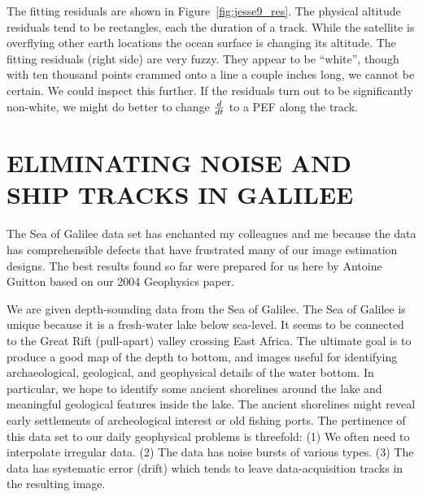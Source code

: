 \par
The fitting residuals
are shown in Figure~\ref{fig:jesse9_res}.
The physical altitude residuals tend to be rectangles,
each the duration of a track.
While the satellite is overflying other earth locations the ocean surface
is changing its altitude.
The fitting residuals (right side) are very fuzzy.
They appear to be ``white'', though with ten thousand points
crammed onto a line a couple inches long, we cannot be certain.
We could inspect this further.
If the residuals turn out to be significantly non-white,
we might do better to change $d\over dt$ to a PEF along the track.


















\section{ELIMINATING NOISE AND SHIP TRACKS IN GALILEE}

\par
The Sea of Galilee data set has enchanted my colleagues and me
because the data has comprehensible defects
that have frustrated many of our image estimation designs.
The best results found so far were prepared for us here
by Antoine Guitton based on our 2004 Geophysics paper.

\par

We are given depth-sounding data from the Sea of 
Galilee.  The Sea of Galilee is unique
because it is a fresh-water lake below sea-level.
It seems to be connected to the Great Rift (pull-apart)
valley crossing East Africa. The ultimate goal is to produce a good map of
the depth to bottom, and images useful for identifying archaeological,
geological, and geophysical details of the water bottom. In particular,
we hope to identify some ancient shorelines around the lake and meaningful 
geological features inside the lake. The ancient shorelines might
reveal early settlements of archeological interest or old fishing ports.
The pertinence of this data set to our daily geophysical problems is threefold:
(1) We often need to interpolate irregular data.
(2) The data has noise bursts of various types.
(3) The data has systematic error (drift)
which tends to leave data-acquisition tracks in the resulting image.

